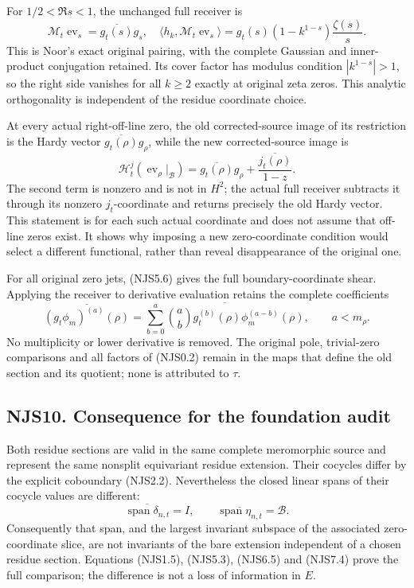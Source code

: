 For \(1/2<\Re s<1\), the unchanged full receiver is \[
\mathcal M_t\operatorname{ev}_s=\overline{g_t(s)}g_s,
\quad
\langle h_k,\mathcal M_t\operatorname{ev}_s\rangle
=g_t(s)(1-k^{1-s})\frac{\zeta(s)}s.
\tag{NJS9.2}
\] This is Noor's exact original pairing, with the complete Gaussian and
inner-product conjugation retained. Its cover factor has modulus
condition \(|k^{1-s}|>1\), so the right side vanishes for all \(k\ge2\)
exactly at original zeta zeros. This analytic orthogonality is
independent of the residue coordinate choice.

At every actual right-off-line zero, the old corrected-source image of
its restriction is the Hardy vector \(\overline{g_t(\rho)}g_\rho\),
while the new corrected-source image is \[
\mathcal H_t^j(\operatorname{ev}_\rho|_{\mathcal B})
=\overline{g_t(\rho)}g_\rho
+\frac{\overline{j_t(\rho)}}{1-z}.
\tag{NJS9.3}
\] The second term is nonzero and is not in \(H^2\); the actual full
receiver subtracts it through its nonzero \(j_t\)-coordinate and returns
precisely the old Hardy vector. This statement is for each such actual
coordinate and does not assume that off-line zeros exist. It shows why
imposing a new zero-coordinate condition would select a different
functional, rather than reveal disappearance of the original one.

For all original zero jets, (NJS5.6) gives the full boundary-coordinate
shear. Applying the receiver to derivative evaluation retains the
complete coefficients \[
\overline{(g_t\phi_m)^{(a)}(\rho)}
=\overline{\sum_{b=0}^a\binom ab
g_t^{(b)}(\rho)\phi_m^{(a-b)}(\rho)},\qquad a<m_\rho.
\tag{NJS9.4}
\] No multiplicity or lower derivative is removed. The original pole,
trivial-zero comparisons and all factors of (NJS0.2) remain in the maps
that define the old section and its quotient; none is attributed to
\(\tau\).

\subsection{NJS10. Consequence for the foundation
audit}\label{njs10.-consequence-for-the-foundation-audit}

Both residue sections are valid in the same complete meromorphic source
and represent the same nonsplit equivariant residue extension. Their
cocycles differ by the explicit coboundary (NJS2.2). Nevertheless the
closed linear spans of their cocycle values are different: \[
\overline{\operatorname{span}\delta_{n,t}}=I,
\qquad
\overline{\operatorname{span}\eta_{n,t}}=\mathcal B.
\tag{NJS10.1}
\] Consequently that span, and the largest invariant subspace of the
associated zero-coordinate slice, are not invariants of the bare
extension independent of a chosen residue section. Equations (NJS1.5),
(NJS5.3), (NJS6.5) and (NJS7.4) prove the full comparison; the
difference is not a loss of information in \(E\).

